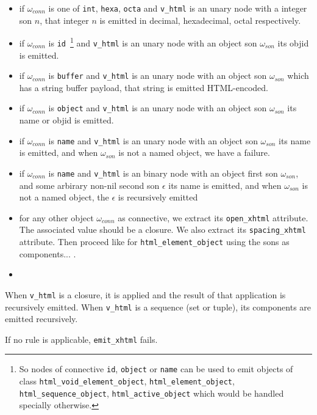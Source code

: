 \begin{itemize}

\item if $\omega_{conn}$ is one of \texttt{int}, \texttt{hexa},
  \texttt{octa} and \texttt{v\_html} is an unary node with a integer
  son $n$, that integer $n$ is emitted in decimal, hexadecimal, octal respectively.

\item if $\omega_{conn}$ is \texttt{id}~\footnote{So nodes of
  connective \texttt{id}, \texttt{object} or \texttt{name} can be used
  to emit objects of class \texttt{html\_void\_element\_object},
  \texttt{html\_element\_object}, \texttt{html\_sequence\_object},
  \texttt{html\_active\_object} which would be handled specially
  otherwise.}  and \texttt{v\_html} is an unary node with an object
  son $\omega_{son}$ its objid is emitted.
\item if $\omega_{conn}$ is \texttt{buffer} and \texttt{v\_html} is an
  unary node with an object son $\omega_{son}$ which has a string
  buffer payload, that string is emitted HTML-encoded.
\item if $\omega_{conn}$ is \texttt{object} and \texttt{v\_html} is an unary node with an object son $\omega_{son}$ its name or objid is emitted.
\item if $\omega_{conn}$ is \texttt{name} and \texttt{v\_html} is an
  unary node with an object son $\omega_{son}$ its name is emitted,
  and when $\omega_{son}$ is not a named object, we have a failure.
\item if $\omega_{conn}$ is \texttt{name} and \texttt{v\_html} is an
  binary node with an object first son $\omega_{son}$, and some arbirary non-nil second son $\epsilon$ its name is emitted,
  and when $\omega_{son}$ is not a named object, the $\epsilon$ is recursively emitted
\item for any other object $\omega_{conn}$ as connective, we extract
  its \texttt{open\_xhtml} attribute. The associated value should be a
  closure. We also extract its \texttt{spacing\_xhtml} attribute. Then
  proceed like for \texttt{html\_element\_object} using the sons as
  components... {\color{red}{@@ not sure @@}}.
\item {\color{red}{@@ to be completed a lot.}}
  
\end{itemize}


When \texttt{v\_html} is a closure, it is applied {\color{red}{@@ to
    be completed}} and the result of that application is recursively
emitted. When \texttt{v\_html} is a sequence (set or tuple), its
components are emitted recursively.

If no rule is applicable, \texttt{emit\_xhtml} fails.

